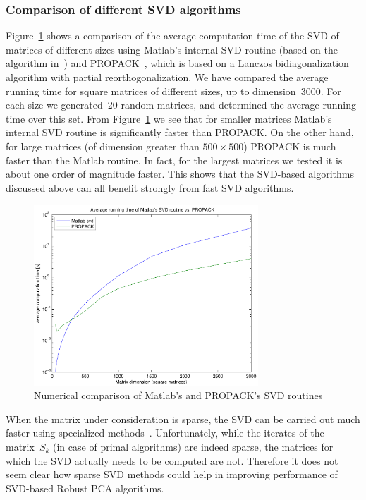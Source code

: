 \documentclass{../../common/projectreport}
\begin{document}
\subsubsection{Comparison of different SVD algorithms}
\label{Algorithms:Discussion:SVD:Comparison:Subsubsec}

Figure~\ref{Algorithms:Discussion:SVD:MatlabVSPropack:figure} shows a comparison of the average computation time of the SVD of matrices of different sizes using Matlab's internal SVD routine (based on the algorithm in~\cite{Demmel:1990vn}) and PROPACK~\cite{Larsen:1998uq}, which is based on a Lanczos bidiagonalization algorithm with partial reorthogonalization. We have compared the average running time for square matrices of different sizes, up to dimension~$3000$. For each size we generated~$20$ random matrices, and determined the average running time over this set. From Figure~\ref{Algorithms:Discussion:SVD:MatlabVSPropack:figure} we see that for smaller matrices Matlab's internal SVD routine is significantly faster than PROPACK. On the other hand, for large matrices (of dimension greater than $500 \times 500$) PROPACK is much faster than the Matlab routine. In fact, for the largest matrices we tested it is about one order of magnitude faster. This shows that the SVD-based algorithms discussed above can all benefit strongly from fast SVD algorithms. 
%
\begin{figure}[htbp]
\centering
\includegraphics[width=0.75\textwidth]{../figures/svd_comparison}
\caption{Numerical comparison of Matlab's and PROPACK's SVD routines}
\label{Algorithms:Discussion:SVD:MatlabVSPropack:figure}
\end{figure}


When the matrix under consideration is sparse, the SVD can be carried out much faster using specialized methods~\cite{Berry:2005uq}. Unfortunately, while the iterates of the matrix~$S_k$ (in case of primal algorithms) are indeed sparse, the matrices for which the SVD actually needs to be computed are not. Therefore it does not seem clear how sparse SVD methods could help in improving performance of SVD-based Robust PCA algorithms. 
\end{document}
